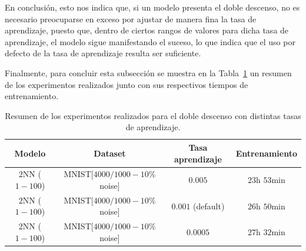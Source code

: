 En conclusión, esto nos indica que, si un modelo presenta el doble descenso, no es necesario preocuparse en exceso por ajustar de manera fina la tasa de aprendizaje, puesto que, dentro de ciertos rangos de valores para dicha tasa de aprendizaje, el modelo sigue manifestando el suceso, lo que indica que el uso por defecto de la tasa de aprendizaje resulta ser suficiente.\newline

Finalmente, para concluir esta subsección se muestra en la Tabla~\ref{tab:difflr} un resumen de los experimentos realizados junto con sus respectivos tiempos de entrenamiento.\newline

\begin{table}[h!]
    \centering
    \begin{tabular}{|c|c|c|c|}
    \hline
    \textbf{Modelo}       & \textbf{Dataset} & \textbf{Tasa aprendizaje} & \textbf{Entrenamiento} \\ 
    \hline
    $2$NN ($1-100$)     & MNIST[$4000/1000 - 10$\% noise]      & $0.005$      & $23$h $53$min         \\ 
    $2$NN ($1-100$)     & MNIST[$4000/1000 - 10$\% noise]      & $0.001$ (default)      & $26$h $50$min     \\ 
    $2$NN ($1-100$)     & MNIST[$4000/1000 - 10$\% noise]      & $0.0005$      & $27$h $32$min         \\ 
    \hline
    \end{tabular}
    \caption[Resumen de los experimentos realizados para el doble descenso con distintas tasas de aprendizaje.]{Resumen de los experimentos realizados para el doble descenso con distintas tasas de aprendizaje.}\label{tab:difflr}
\end{table}

\endinput
